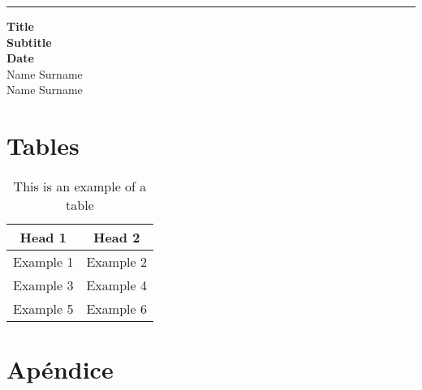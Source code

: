 \documentclass[12pt]{article}
\begin{document}
	\begin{titlepage}
		\raggedleft %
	
		\rule{1pt}{\textheight} %
		\hspace{0.05\textwidth} %
		\parbox[b]{0.75\textwidth}{ %
		
		{\Huge\bfseries Title\\[0.5\baselineskip] Subtitle\\[0.2\baselineskip] Date}\\[2\baselineskip] %
		{\Large{Name Surname \\[0.5\baselineskip] Name Surname}} %
		
		\vspace{0.5\textheight} %
		}
	\end{titlepage}
	\newpage
	\tableofcontents
	\newpage
	\section{Tables}
	\begin{table}[H]
		\centering
		\begin{tabular}{|c|c|}
		  \rowcolor{gray!50}
		  \hline
			Head 1 & Head 2 \\
			\hline
			Example 1 & Example 2 \\
			Example 3 & Example 4 \\
			Example 5 & Example 6 \\
			\hline
		\end{tabular}
		\caption{This is an example of a table}
		\label{tab: 01}
	\end{table}
	\section{Apéndice}
	\listoffigures
	\listoftables
\end{document}

